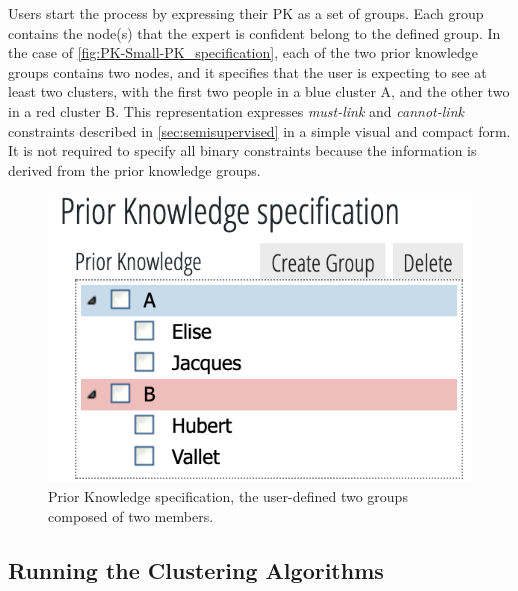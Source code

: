 Users start the process by expressing their PK as a set of groups. Each group contains the node(s) that the expert is confident belong to the defined group.
In the case of \autoref{fig:PK-Small-PK_specification}, each of the two prior knowledge groups contains two nodes, and it specifies that the user is expecting to see at least two clusters, with the first two people in a blue cluster A, and the other two in a red cluster B.
This representation expresses \emph{must-link} and \emph{cannot-link} constraints described in \autoref{sec:semisupervised} in a simple visual and compact form. It is not required to specify all binary constraints because the information is derived from the prior knowledge groups.

\begin{figure}[!ht]
\centering
\includegraphics[trim={15 0 0 30}, clip, width=0.6\linewidth]{static/figures/PK-Clustering/VISPaperFigures/Small-PK_specification}
\caption{Prior Knowledge specification, the user-defined two groups composed of two members.}%
\label{fig:PK-Small-PK_specification}
\end{figure}

\subsection{Running the Clustering Algorithms} \label{sub:families}

